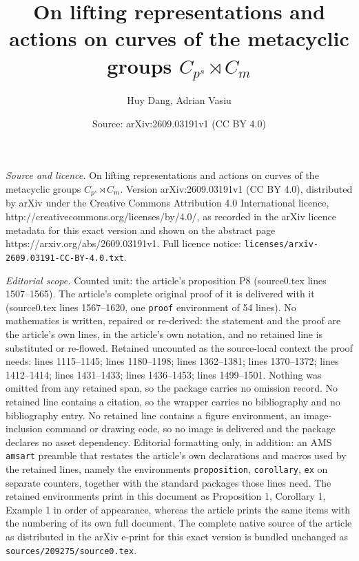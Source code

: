 \documentclass[10pt,a4paper]{amsart}
\title{On lifting representations and actions on curves of the metacyclic groups $C_{p^s}\rtimes C_m$}
\author{Huy Dang, Adrian Vasiu}
\date{Source: arXiv:2609.03191v1 (CC BY 4.0)}
\begin{document}
\maketitle

\noindent\emph{Source and licence.} On lifting representations and actions on curves of the metacyclic groups $C_{p^s}\rtimes C_m$. Version arXiv:2609.03191v1 (CC BY 4.0), distributed by arXiv under the Creative Commons Attribution 4.0 International licence, http://creativecommons.org/licenses/by/4.0/, as recorded in the arXiv licence metadata for this exact version and shown on the abstract page https://arxiv.org/abs/2609.03191v1. Full licence notice: \texttt{licenses/arxiv-2609.03191-CC-BY-4.0.txt}.\par\smallskip

\noindent\textit{Editorial scope.} Counted unit: the article's proposition P8 (source0.tex lines 1507--1565). The article's complete original proof of it is delivered with it (source0.tex lines 1567--1620, one \texttt{proof} environment of 54 lines). No mathematics is written, repaired or re-derived: the statement and the proof are the article's own lines, in the article's own notation, and no retained line is substituted or re-flowed.  Retained uncounted as the source-local context the proof needs: lines 1115--1145; lines 1180--1198; lines 1362--1381; lines 1370--1372; lines 1412--1414; lines 1431--1433; lines 1436--1453; lines 1499--1501.  Nothing was omitted from any retained span, so the package carries no omission record.  No retained line contains a citation, so the wrapper carries no bibliography and no bibliography entry.  No retained line contains a figure environment, an image-inclusion command or drawing code, so no image is delivered and the package declares no asset dependency.  Editorial formatting only, in addition: an AMS \texttt{amsart} preamble that restates the article's own declarations and macros used by the retained lines, namely the environments \texttt{proposition}, \texttt{corollary}, \texttt{ex} on separate counters, together with the standard packages those lines need.  The retained environments print in this document as Proposition 1, Corollary 1, Example 1 in order of appearance, whereas the article prints the same items with the numbering of its own full document.  The complete native source of the article as distributed in the arXiv e-print for this exact version is bundled unchanged as \texttt{sources/209275/source0.tex}.
\end{document}
